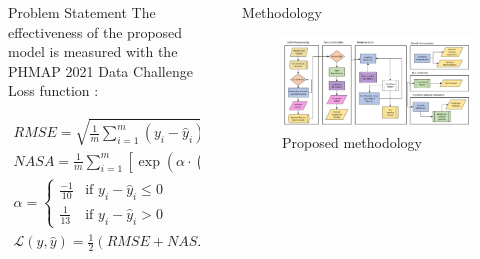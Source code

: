 \documentclass[final, 12pt]{beamer}
\newlength{\sepwidth}
\newlength{\colwidth}
\newlength{\smallcolwidth}
\newlength{\bigcolwidth}
\newcommand{\separatorcolumn}{\begin{column}{\sepwidth}\end{column}}
\begin{document}
\begin{frame}[t]
\begin{columns}[t]
\begin{column}{\smallcolwidth}
\begin{block}{Problem Statement}
        The effectiveness of the proposed model is measured with the PHMAP 2021 Data Challenge Loss function \cite{chao2021phm}:

        \begin{equation} \label{eqn:phmap_loss}
            \begin{gathered}
                RMSE = \sqrt{\frac{1}{m}\sum_{i=1}^{m} (y_i - \hat{y}_i)^{2}} \\
                NASA = \frac{1}{m}\sum_{i=1}^{m} \left[\exp (\alpha \cdot (y_i - \hat{y}_i)) - 1\right]\\
                \alpha = \begin{cases}
                    \frac{-1}{10} & \text{if } y_i - \hat{y}_i \leq 0 \\
                    \frac{1}{13} & \text{if } y_i - \hat{y}_i > 0
                \end{cases}  \\
                \mathcal{L}(y, \hat{y}) = \frac{1}{2} \left(RMSE + NASA\right) \\
            \end{gathered}
        \end{equation}

    \end{block}

\end{column}

\separatorcolumn

\begin{column}{\bigcolwidth}

    \begin{block}{Methodology}

        \begin{figure}
            \centering
            \includegraphics[width=\textwidth]{figures/research_diagram.pdf}
            \caption{Proposed methodology}
        \end{figure}


\end{block}
\end{column}
\end{columns}
\end{frame}
\end{document}

